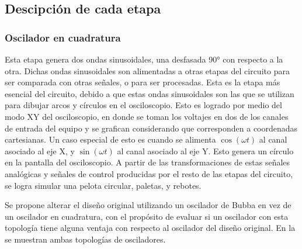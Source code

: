 \subsection{Descipción de cada etapa}
\subsubsection{Oscilador en cuadratura}
Esta etapa genera dos ondas sinusoidales, una desfasada 90° con respecto a la otra.
Dichas ondas sinusoidales son alimentadas a otras etapas del circuito para ser comparada con otras señales, o para ser procesadas. 
Esta es la etapa más esencial del circuito, debido a que estas ondas sinusoidales son las que se utilizan para dibujar arcos y círculos en el osciloscopio.
Esto es logrado por medio del modo XY del osciloscopio, en donde se toman los voltajes en dos de los canales de entrada del equipo y se grafican considerando que corresponden a coordenadas cartesianas. 
Un caso especial de esto es cuando se alimenta $\cos(\omega t)$ al canal asociado al eje X, y $\sin(\omega t)$ al canal asociado al eje Y. 
Esto genera un círculo en la pantalla del osciloscopio.
A partir de las transformaciones de estas señales analógicas y señales de control producidas por el resto de las etapas del circuito, se logra simular una pelota circular, paletas, y rebotes.

Se propone alterar el diseño original utilizando un oscilador de Bubba en vez de un oscilador en cuadratura, con el propósito de evaluar si un oscilador con esta topología tiene alguna ventaja con respecto al oscilador del diseño original. 
En la  se muestran ambas topologías de osciladores.

